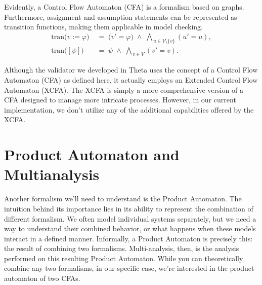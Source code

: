 Evidently, a Control Flow Automaton (CFA) is a formalism based on graphs. 
Furthermore, assignment and assumption statements can be represented as transition functions, 
making them applicable in model checking.
\begin{align}
\mathrm{tran}\bigl(v := \varphi\bigr)
&\;=\;
\bigl(v' = \varphi\bigr)
\;\land\;
\bigwedge_{\,u \in V \setminus \{v\}} (u' = u),
\\
\mathrm{tran}\bigl([\psi]\bigr)
&\;=\;
\psi
\;\land\;
\bigwedge_{\,v \in V} (v' = v).
\end{align}

Although the validator we developed in Theta uses the concept of a Control Flow Automaton (CFA) as 
defined here, it actually employs an Extended Control Flow Automaton (XCFA). The XCFA is simply 
a more comprehensive version of a CFA designed to manage more intricate processes. However, in 
our current implementation, we don't utilize any of the additional capabilities offered by the XCFA.



\section{Product Automaton and Multianalysis}
Another formalism we'll need to understand is the Product Automaton. The intuition behind its 
importance lies in its ability to represent the combination of different formalism. We 
often model individual systems separately, but we need a way to understand their combined behavior, 
or what happens when these models interact in a defined manner. Informally, a Product 
Automaton is precisely this: the result of combining two formalisms. Multi-analysis, then,
is the analysis performed on this resulting Product Automaton. While you can theoretically 
combine any two formalisms, in our specific case, we're interested in the product automaton 
of two CFAs.


